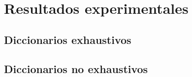 \section{Resultados experimentales}
\label{sec:LevenResults}


\subsection{Diccionarios exhaustivos}
\label{subsec:LevDicExhaust}


\subsection{Diccionarios no exhaustivos}
\label{subsec:LevDicNoExhaust}


\endinput
